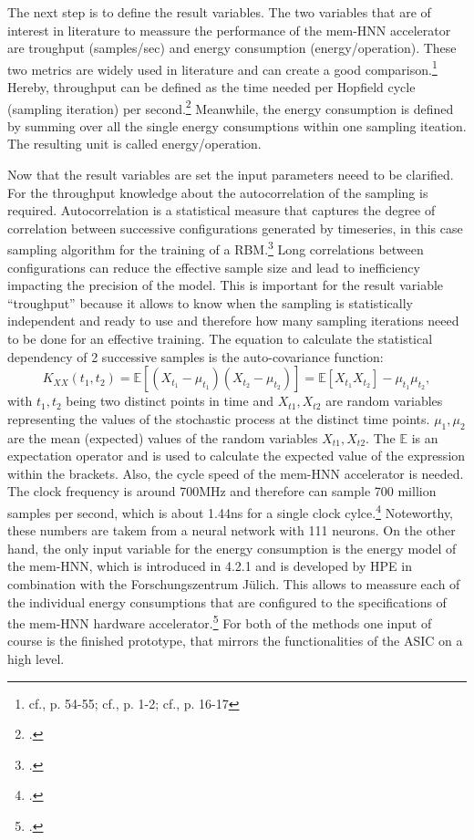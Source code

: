 The next step is to define the result variables. The two variables that are of interest in literature to meassure the performance of the
\ac{mem-HNN} accelerator are troughput (samples/sec) and energy consumption (energy/operation). 
These two metrics are widely used in literature and can create a good comparison.\footnote{cf.\cite{bellettiJanusFPGABasedSystem2009}, p. 54-55; cf.\cite{aaditAcceleratingAdaptiveParallel2023}, p. 1-2; cf.\cite{ortega-zamoranoFPGAHardwareAcceleration2016}, p. 16-17}
Hereby, throughput can be defined as the time needed per Hopfield cycle (sampling iteration) per second.\footcite[cf.][6-7]{bohmNoiseinjectedAnalogIsing2022} 
Meanwhile, the energy consumption is defined by summing over all the single energy consumptions within one sampling iteation.
The resulting unit is called energy/operation. 

Now that the result variables are set the input parameters neeed to be clarified. 
For the throughput knowledge about the autocorrelation of the sampling is required.
Autocorrelation is a statistical measure that captures the degree of correlation between successive configurations generated by timeseries, in this case sampling algorithm for the training of a \ac{RBM}.\footcite[cf.][1-6]{tanakaReductionAutocorrelationHMC2017}
Long correlations between configurations can reduce the effective sample size and lead to inefficiency impacting the precision of the model.
This is important for the result variable ``troughput'' because it allows to know when the sampling is statistically independent and ready to use and therefore how many sampling iterations neeed to be done for an effective training. 
The equation to calculate the statistical dependency of 2 successive samples is the auto-covariance function: 
\begin{equation}
    K_{XX}(t_1, t_2) = \mathbb{E}[(X_{t_1} - \mu_{t_1})(X_{t_2} - \mu_{t_2})] = \mathbb{E}[X_{t_1} X_{t_2}] - \mu_{t_1}\mu_{t_2},
\end{equation}
with \(t_1,t_2\) being two distinct points in time and \(X_{t1},X_{t2}\) are random variables representing the values of the stochastic process at the distinct time points. 
\(\mu_1,\mu_2\) are the mean (expected) values of the random variables \(X_{t1},X_{t2}\). 
The \(\mathbb{E}\) is an expectation operator and is used to calculate the expected value of the expression within the brackets.
Also, the cycle speed of the \ac{mem-HNN} accelerator is needed. 
The clock frequency is around 700MHz and therefore can sample 700 million samples per second, which is about 1.44ns for a single clock cylce.\footcite[cf. table1][7-8]{caiPowerefficientCombinatorialOptimization2020} 
Noteworthy, these numbers are takem from a neural network with 111 neurons. 
On the other hand, the only input variable for the energy consumption is the energy model of the \ac{mem-HNN}, which is introduced in 4.2.1 and is developed by HPE in combination with the Forschungszentrum Jülich.
This allows to meassure each of the individual energy consumptions that are configured to the specifications of the \ac{mem-HNN} hardware accelerator.\footcite[cf.][1-5]{hizzaniMemristorbasedHardwareAlgorithms2023}
For both of the methods one input of course is the finished prototype, that mirrors the functionalities of the \ac{ASIC} on a high level.

